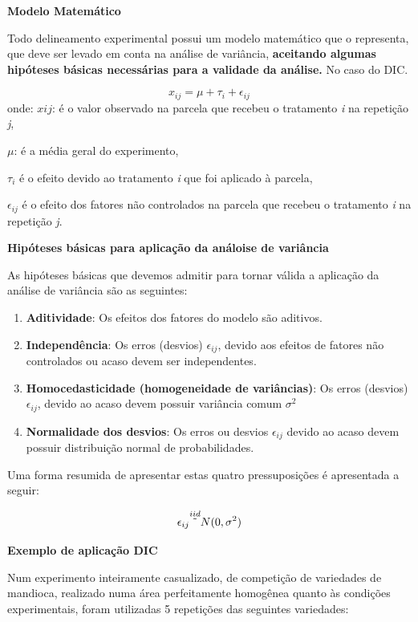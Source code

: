 \documentclass[
]{book}
\begin{document}
\textbf{Modelo Matemático}

Todo delineamento experimental possui um modelo matemático que o representa, que deve ser levado em conta na análise de variância, \textbf{aceitando algumas hipóteses básicas necessárias para a validade da análise.} No caso do DIC.

\[
x_{ij}= \mu + \tau_i + \epsilon_{ij}
\]
onde:
\(x{ij}\): é o valor observado na parcela que recebeu o tratamento \emph{i} na repetição \emph{j},

\(\mu\): é a média geral do experimento,

\(\tau_i\) é o efeito devido ao tratamento \emph{i} que foi aplicado à parcela,

\(\epsilon_{ij}\) é o efeito dos fatores não controlados na parcela que recebeu o tratamento \emph{i} na repetição \emph{j}.

\textbf{Hipóteses básicas para aplicação da análoise de variância}

As hipóteses básicas que devemos admitir para tornar válida a aplicação da análise de variância são as seguintes:

\begin{enumerate}
\def\labelenumi{\arabic{enumi})}
\item
  \textbf{Aditividade}: Os efeitos dos fatores do modelo são aditivos.
\item
  \textbf{Independência}: Os erros (desvios) \(\epsilon_{ij}\), devido aos efeitos de fatores não controlados ou acaso devem ser independentes.
\item
  \textbf{Homocedasticidade (homogeneidade de variâncias)}: Os erros (desvios) \(\epsilon_{ij}\), devido ao acaso devem possuir variância comum \(\sigma^2\)
\item
  \textbf{Normalidade dos desvios}: Os erros ou desvios \(\epsilon_{ij}\) devido ao acaso devem possuir distribuição normal de probabilidades.
\end{enumerate}

Uma forma resumida de apresentar estas quatro pressuposições é apresentada a seguir:

\[
\epsilon_{ij} \overset{iid}{\tilde{}} N(0,\sigma^2) \\
\]

\textbf{Exemplo de aplicação DIC}

Num experimento inteiramente casualizado, de competição de variedades de mandioca, realizado numa área perfeitamente homogênea quanto às condições experimentais, foram utilizadas 5 repetições das seguintes variedades:
\end{document}
